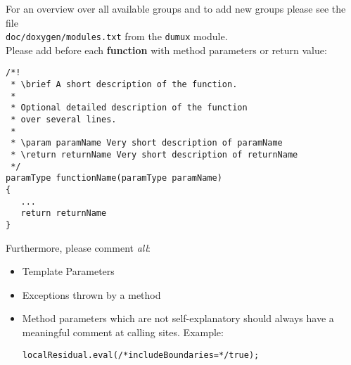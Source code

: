 For an overview over all available groups and to add new groups please
see the file\\ \texttt{doc/doxygen/modules.txt} from the \texttt{dumux} module.\\
Please add before each \textbf{function} with method parameters or return value:
\begin{lstlisting}[style=DumuxCode]
/*!
 * \brief A short description of the function.
 *
 * Optional detailed description of the function
 * over several lines.
 *
 * \param paramName Very short description of paramName
 * \return returnName Very short description of returnName
 */
paramType functionName(paramType paramName)
{
   ...
   return returnName
}
\end{lstlisting}
Furthermore, please comment \textit{all}:
\begin{itemize}
  \item Template Parameters
  \item Exceptions thrown by a method
  \item Method parameters which are not self-explanatory should always
        have a meaningful comment at calling sites. Example:
  \begin{lstlisting}[style=DumuxCode]
    localResidual.eval(/*includeBoundaries=*/true);
  \end{lstlisting}
\end{itemize}

